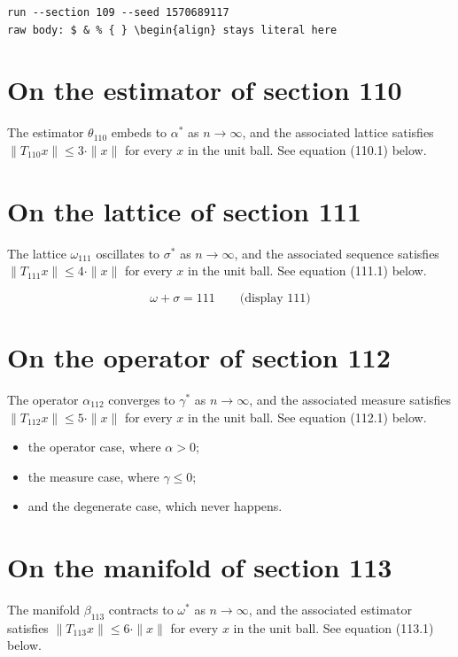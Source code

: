 \documentclass{article}
\begin{document}
\begin{verbatim}
run --section 109 --seed 1570689117
raw body: $ & % { } \begin{align} stays literal here
\end{verbatim}

\section{On the estimator of section 110}
The estimator $\theta_{110}$ embeds to $\alpha^{*}$ as $n \to \infty$,
and the associated lattice satisfies $\|T_{110} x\| \leq 3 \cdot \|x\|$
for every $x$ in the unit ball. See equation (110.1) below.

\section{On the lattice of section 111}
The lattice $\omega_{111}$ oscillates to $\sigma^{*}$ as $n \to \infty$,
and the associated sequence satisfies $\|T_{111} x\| \leq 4 \cdot \|x\|$
for every $x$ in the unit ball. See equation (111.1) below.

$$
\omega + \sigma = 111 \qquad \text{(display 111)}
$$

\section{On the operator of section 112}
The operator $\alpha_{112}$ converges to $\gamma^{*}$ as $n \to \infty$,
and the associated measure satisfies $\|T_{112} x\| \leq 5 \cdot \|x\|$
for every $x$ in the unit ball. See equation (112.1) below.

\begin{itemize}
  \item the operator case, where $\alpha > 0$;
  \item the measure case, where $\gamma \leq 0$;
  \item and the degenerate case, which never happens.
\end{itemize}

\section{On the manifold of section 113}
The manifold $\beta_{113}$ contracts to $\omega^{*}$ as $n \to \infty$,
and the associated estimator satisfies $\|T_{113} x\| \leq 6 \cdot \|x\|$
for every $x$ in the unit ball. See equation (113.1) below.
\end{document}
